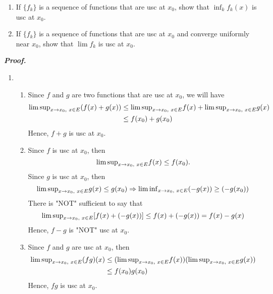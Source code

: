 \documentclass[a4paper,11pt]{article}
\begin{document}
\begin{enumerate}
\begin{enumerate}
\item If $\{ f_k \}$ is a sequence of functions that are usc at $x_0$, show that $\inf_k f_k(x)$ is usc at $x_0$.

\item If $\{ f_k \}$ is a sequence of functions that are usc at $x_0$ and converge uniformly near $x_0$, show that $\lim f_k$ is usc at $x_0$.\\

\end{enumerate}
\textit{\textbf {Proof.}}

\begin{enumerate}

\item
\begin{enumerate}

\item
Since $f$ and $g$ are two functions that are usc at $x_0$, we will have\\
$$\begin{aligned}
{\lim \sup}_{x \to x_0, \hspace{0.1cm} x \in E} ( f(x) + g(x) )
& \leq {\lim \sup}_{x \to x_0, \hspace{0.1cm} x \in E} f(x) + {\lim \sup}_{x \to x_0, \hspace{0.1cm} x \in E} g(x)\\
& \leq f(x_0) + g(x_0)
\end{aligned}$$
Hence, $f + g$ is usc at $x_0$.\\

\item
Since $f$ is usc at $x_0$, then
$${\lim \sup}_{x \to x_0, \hspace{0.1cm} x \in E} f(x) \leq f(x_0).$$
Since $g$ is usc at $x_0$, then
$${\lim \sup}_{x \to x_0, \hspace{0.1cm} x \in E} g(x) \leq g(x_0)
\Rightarrow
{\lim \inf}_{x \to x_0, \hspace{0.1cm} x \in E} (-g(x)) \geq (-g(x_0))$$
There is "NOT" sufficient to say that
$${\lim \sup}_{x \to x_0, \hspace{0.1cm} x \in E} [f(x) + (-g(x))] \leq f(x) + (-g(x)) = f(x) - g(x)$$
Hence, $f - g$ is "NOT" usc at $x_0$.\\

\item Since $f$ and $g$ are usc at $x_0$, then
$$\begin{aligned}
{\lim \sup}_{x \to x_0, \hspace{0.1cm} x \in E} (fg)(x)
& \leq ({\lim \sup}_{x \to x_0, \hspace{0.1cm} x \in E} f(x) )
({\lim \sup}_{x \to x_0, \hspace{0.1cm} x \in E} g(x))\\
& \leq f(x_0)g(x_0)
\end{aligned}$$
Hence, $fg$ is usc at $x_0$.\\


\end{enumerate}
\end{enumerate}
\end{enumerate}
\end{document}
